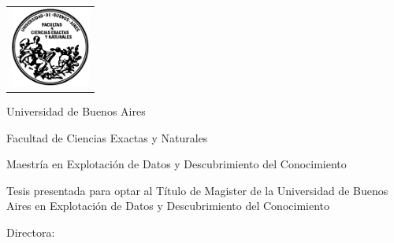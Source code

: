 \newcommand{\HRule}{\rule{\linewidth}{0.2mm}}
%
\thispagestyle{empty}

\begin{center}\leavevmode

\vspace{-2cm}

\begin{tabular}{l}
\includegraphics[width=2.6cm]{frontmatter/logofcen.pdf}
\end{tabular}


{\large \sc Universidad de Buenos Aires

Facultad de Ciencias Exactas y Naturales

Maestría en Explotación de Datos y Descubrimiento del Conocimiento}

\vspace{2.0cm}


\begin{huge}
\textbf{\tituloTesis}
\end{huge}

\vspace{2cm}

{\large Tesis presentada para optar al Título de Magister de la Universidad de Buenos Aires en Explotación de Datos y Descubrimiento del Conocimiento}

\vspace{2cm}

{\Large \autor}

\end{center}

\vfill

{\large

{Directora: \director}

\vspace{1cm}



\lugar
\vspace{1cm}

\fechapre

\vspace{1cm}
\fechadef

}

\newpage\thispagestyle{empty}
